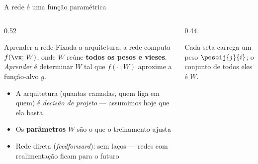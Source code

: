 \documentclass[aspectratio=169, 11pt]{beamer}
\begin{document}
\begin{frame}{A rede é uma função paramétrica}
  \begin{columns}[T]
    \begin{column}{0.52\textwidth}
      \begin{defbox}{Aprender a rede}
        Fixada a arquitetura, a rede computa $f(\vx;\, W)$, onde $W$ reúne
        \textbf{todos os pesos e vieses}. \emph{Aprender} é determinar $W$
        tal que $f(\cdot\,; W)$ aproxime a função-alvo $g$.
      \end{defbox}
      \begin{itemize}\setlength{\itemsep}{0.3ex}
        \item A arquitetura (quantas camadas, quem liga em quem) é
              \emph{decisão de projeto} — assumimos hoje que ela basta
        \item Os \textbf{parâmetros} $W$ são o que o treinamento ajusta
        \item Rede direta (\emph{feedforward}): sem laços — redes com
              realimentação ficam para o futuro
      \end{itemize}
    \end{column}
    \begin{column}{0.44\textwidth}
      \begin{center}
      \end{center}
      \begin{center}
        {\small\color{icCinza} Cada seta carrega um peso $\pesoij{j}{i}$;
        o conjunto de todos eles é $W$.}
      \end{center}
    \end{column}
  \end{columns}
\end{frame}
\end{document}

